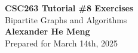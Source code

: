 \begin{titlepage}
    \null %
    \vfill
    \begin{center}
        {\fontsize{35}{48}\selectfont \bfseries CSC263 Tutorial \#8 Exercises}
        \vspace{20pt} \\
        {\LARGE Bipartite Graphs and Algorithms} \\
        \vspace{20pt}
        \textbf{Alexander He Meng}
        \vspace{8pt}
        \\ Prepared for March 14th, 2025
    \end{center}
    \vfill
\end{titlepage}

